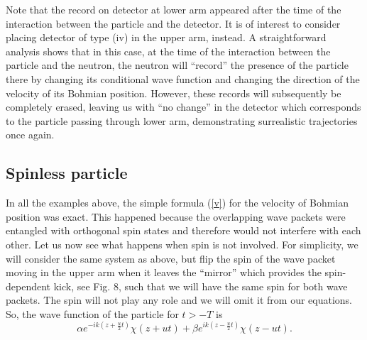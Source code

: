 \documentclass[12pt,preprint,tightenlines]{elsarticle}
\begin{document}
Note that the record on detector at lower arm appeared after the
time of the interaction between the particle and the detector. It
is of interest to consider placing detector of type (iv) in the upper arm, instead. A straightforward analysis shows that in this case,
at the time of the interaction between the particle and the neutron,
the neutron will ``record'' the presence of the particle there by changing its conditional wave function and changing the direction
of the velocity of its Bohmian position. However, these records will subsequently
be completely erased, leaving us with ``no change'' in the detector
which corresponds to the particle  passing through
lower arm, demonstrating surrealistic trajectories once again.


\subsection{ Spinless particle}



In all the examples above, the simple formula (\ref{v}) for the velocity
of Bohmian position was exact. This happened because the overlapping
wave packets were entangled with orthogonal spin states and therefore would not interfere with each other. Let us now
see what happens when spin is not involved. For simplicity, we will
consider the same system as above, but flip the spin of the
wave packet moving in the upper arm when it leaves the ``mirror'' which provides the spin-dependent kick, see Fig. 8,
  such that we will have the same spin for both wave packets. The spin will not play any role and we will omit it from our equations.
So, the wave function of the particle for $t>-T$ is
 \begin{equation}
\alpha e^{-ik(z+\frac{u}{2}t)}\chi(z+ut)+\beta e^{ik(z-\frac{u}{2}t)}\chi(z-ut).\label{psioutnospin}
\end{equation}
\end{document}
